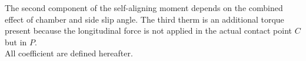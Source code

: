 The second component of the self-aligning moment depends on the combined effect of chamber and side slip angle. The third therm is an additional torque present because the longitudinal force is not applied in the actual contact point $C$ but in $P$.\cite{pacejka2012tire} \\
All coefficient are defined hereafter.
%
%
